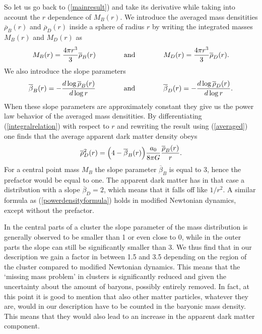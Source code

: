 \documentclass[a4paper,12pt]{article}
\begin{document}
So let us go back to (\ref{mainresult}) and take its derivative while taking into account the $r$ dependence of $M_B(r)$. 
 We introduce the averaged mass densitities $\overline{\rho}_B(r)$ and $\overline{\rho}_D(r)$ inside a sphere of radius $r$ by writing the integrated masses $M_B(r)$ and $M_D(r)$ as
 \begin{equation}
\label{averaged} 
 M_B(r) = {4\pi r^3\over 3} \overline{\rho}_B(r)\qquad\qquad\mbox{and} \qquad\qquad	M_D(r) = {4\pi r^3\over 3}\overline{\rho}_D(r) .
 \end{equation}
We also introduce the slope parameters
\begin{equation}
\overline{\beta}_B(r) = -{d\log \overline{\rho}_B(r)\over d\log r}	\qquad\qquad\mbox{and} \qquad\qquad \overline{\beta}_D(r) = -{d\log \overline{\rho}_D(r)\over d\log r} .
\end{equation}
When these slope parameters are approximately constant they give us  the power law behavior of the averaged mass densitities.  
By differentiating   (\ref{integralrelation}) with respect to $r$ and rewriting the result using (\ref{averaged}) one finds that the average apparent dark matter density obeys
\begin{equation}
\label{powerdensityformula}
\overline{{\rho}}_D^2(r)	= \Bigl ({4-\overline{\beta}_B}(r)\Bigl)
{a_0\over 8\pi G}{\overline{\rho}_B(r)\over  r} .
\end{equation}
For a central point mass $M_B$ the slope parameter $\overline{\beta}_B$ is equal to $3$, hence the prefactor would be equal to one. The apparent dark matter has in that case a distribution with a slope $\overline{\beta}_D=2$, which means that it falls off like $1/r^2$. A similar formula as (\ref{powerdensityformula}) holds in modified Newtonian dynamics, except without the prefactor.  

In the central parts of a cluster  the slope parameter of the mass distribution is generally observed to  be smaller than 1 or even close to 0, while in the outer parts the slope can still be significantly smaller than 3. We thus find that in our description we gain a factor in between 1.5 and 3.5 depending on the region of the cluster compared to modified Newtonian dynamics. This means that the `missing mass problem' in clusters is significantly reduced and given the uncertainty about the amount of baryons, possibly entirely removed. In fact, at this point it is good to mention that also other matter particles, whatever they are, would in our description have to be counted in the baryonic mass density. This means that they would also lead to an increase in the apparent dark matter component.  
\end{document}
